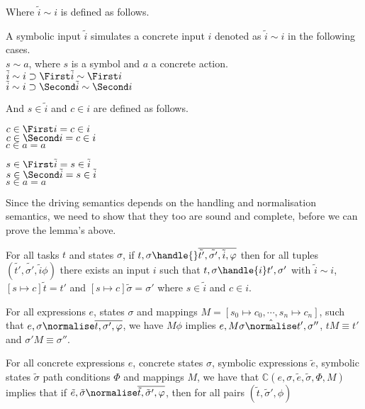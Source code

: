 Where $\tilde{i}\sim i$ is defined as follows.

\begin{definition}
  A symbolic input $\tilde{i}$ simulates a concrete input $i$ denoted as $\tilde{i}\sim i$ in the following cases.\\
  $s\sim a$, where $s$ is a symbol and $a$ a concrete action.\\
  $\tilde{i}\sim i\implies \First \tilde{i} \sim \First i$\\
  $\tilde{i}\sim i\implies \Second \tilde{i} \sim \Second i$
\end{definition}

And $s\in \tilde{i}$ and $c\in i$ are defined as follows.

\begin{definition}
  $c\in \First i = c\in i $\\
  $c\in \Second i = c\in i $\\
  $c\in a = a $
\end{definition}

\begin{definition}
  $s\in \First \tilde{i} = s\in \tilde{i} $\\
  $s\in \Second \tilde{i} = s\in \tilde{i} $\\
  $s\in a = a $
\end{definition}

Since the driving semantics depends on the handling and normalisation semantics, we need to show that they too are sound and complete, before we can prove the lemma's above.


\begin{lemma}
  \label{lem:soundhandle}

  For all tasks $t$ and states $\sigma$,
  if $t,\sigma\handle{}\overline{\tilde{t'},\tilde{\sigma'},\tilde{i},\phi}$
  then for all tuples $(\tilde{t'},\tilde{\sigma'},\tilde{i}\phi)$
  there exists an input $i$ such that $t,\sigma\handle{i}t',\sigma'$
  with $\tilde{i}\sim i$, $[s\mapsto c]\tilde{t}=t'$ and $[s\mapsto c]\tilde{\sigma}=\sigma'$ where $s\in \tilde{i}$ and $c\in i$.

\end{lemma}

\begin{lemma}
  \label{lem:soundnorm}

  For all expressions $e$, states $\sigma$ and mappings $M=[s_0\mapsto c_0,\cdots,s_n\mapsto c_n]$,
  such that $e,\sigma\normalise \overline{t,\sigma',\phi}$,
  we have $M\phi$ implies
  $e,M \sigma \hat{\normalise}t',\sigma''$, $t M \equiv t'$ and $\sigma' M \equiv \sigma''$.



  For all concrete expressions $e$, concrete states $\sigma$, symbolic expressions $\tilde{e}$, symbolic states $\tilde{\sigma}$ path conditions $\Phi$ and mappings $M$,
  we have that $\mathds{C}(e,\sigma,\tilde{e},\tilde{\sigma},\Phi,M)$ implies
  that if $\tilde{e},\tilde{\sigma}\normalise\overline{\tilde{t},\tilde{\sigma}',\phi}$,
  then for all pairs $(\tilde{t},\tilde{\sigma}',\phi)$
\end{lemma}


